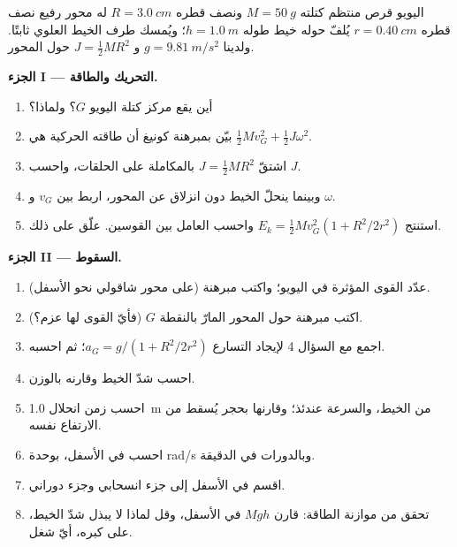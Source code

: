 \begin{problem}
\label{pb:b1:systems-of-points:1}
اليويو قرص منتظم كتلته $M = \qty{50}{g}$ ونصف قطره $R =
\qty{3.0}{cm}$ له محور رفيع نصف قطره $r = \qty{0.40}{cm}$ يُلفّ حوله
خيط طوله $h = \qty{1.0}{m}$؛ ويُمسك طرف الخيط
العلوي ثابتًا. ولدينا $g = \qty{9.81}{m/s^2}$ و $J = \tfrac12 MR^2$ حول
المحور.

\medskip
\noindent\textbf{الجزء I --- التحريك والطاقة.}
\begin{enumerate}
  \item أين يقع مركز كتلة اليويو $G$؟ ولماذا؟
  \item بيّن بمبرهنة كونيغ أن طاقته الحركية هي $\tfrac12
        Mv_G^2 + \tfrac12 J\omega^2$.
  \item اشتقّ $J = \tfrac12 MR^2$ بالمكاملة على الحلقات، واحسب
        $J$.
  \item وبينما ينحلّ الخيط دون انزلاق عن المحور، اربط بين
        $v_G$ و $\omega$.
  \item استنتج $E_k = \tfrac12 Mv_G^2(1 + R^2/2r^2)$ واحسب
        العامل بين القوسين. علّق على ذلك.
\end{enumerate}

\medskip
\noindent\textbf{الجزء II --- السقوط.}
\begin{enumerate}[resume]
  \item عدّد القوى المؤثرة في اليويو؛ واكتب مبرهنة 
        (على محور شاقولي نحو الأسفل).
  \item اكتب مبرهنة  حول المحور المارّ بالنقطة $G$
        (فأيّ القوى لها عزم؟).
  \item اجمع مع السؤال 4 لإيجاد التسارع $a_G = g/(1 +
        R^2/2r^2)$؛ ثم احسبه.
  \item احسب شدّ الخيط وقارنه بالوزن.
  \item احسب زمن انحلال \qty{1.0}{m} من الخيط، والسرعة عندئذ؛
        وقارنها بحجر يُسقط من الارتفاع نفسه.
  \item احسب  في الأسفل، بوحدة \unit{rad/s} وبالدورات في الدقيقة.
  \item اقسم  في الأسفل إلى جزء انسحابي
        وجزء دوراني.
  \item تحقق من موازنة الطاقة: قارن $Mgh$ 
        في الأسفل، وقل لماذا لا يبذل شدّ الخيط، على كبره، أيّ شغل.
\end{enumerate}


\end{problem}
